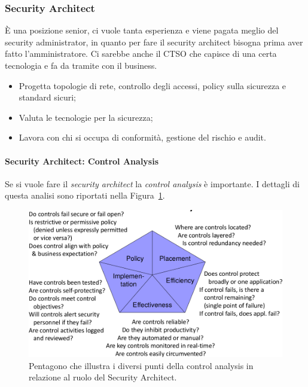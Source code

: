\subsubsection{Security Architect}

È una posizione senior, ci vuole tanta esperienza e viene pagata meglio del
security administrator, in quanto per fare il security architect bisogna
prima aver fatto l'amministratore.
Ci sarebbe anche il CTSO che capisce di una certa tecnologia e fa da tramite
con il business.

\begin{itemize}
\item Progetta topologie di rete, controllo degli accessi, policy sulla
sicurezza e standard sicuri;
\item Valuta le tecnologie per la sicurezza;
\item Lavora con chi si occupa di conformità, gestione del rischio e audit.
\end{itemize}

\paragraph{Security Architect: Control Analysis}

Se si vuole fare il \textit{security architect} la \textit{control analysis} è
importante. I dettagli di questa analisi sono riportati nella 
Figura~\ref{fig:penta}.

\begin{figure}[h!]
        \begin{center}
                \includegraphics[scale=0.3]{res/img/penta}
        \end{center}
        \caption{Pentagono che illustra i diversi punti della control analysis
		in relazione al ruolo del Security Architect.}
		\label{fig:penta}
\end{figure}

